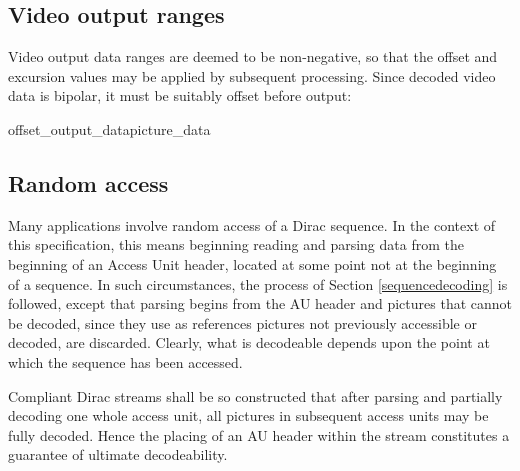 \subsection{Video output ranges}
\label{videooutput}

Video output data ranges are deemed to be non-negative, so that the offset and excursion values 
may be applied by subsequent processing. Since decoded video data is bipolar, it must be 
suitably offset before output:

\begin{pseudo}{offset\_output\_data}{picture\_data}
        \bsCODE{\BitDepth=\LumaDepth}
    \bsELSE
        \bsCODE{\BitDepth=\ChromaDepth}
    \bsEND
        \bsEND
    \bsEND
\bsEND
\end{pseudo}

\subsection{Random access}
\label{randomaccess}

Many applications involve random access of a Dirac sequence. In the context of this specification, this
means beginning reading and parsing data from the beginning of an Access Unit header, located
at some point not at the beginning of a sequence. In such circumstances, the process of Section 
\ref{sequencedecoding} is followed, except that parsing begins from the AU header and pictures
that cannot be decoded, since they use as references pictures not previously accessible or decoded, are discarded.
Clearly, what is decodeable depends upon the point at which the sequence has been accessed.

Compliant Dirac streams shall be so constructed that after parsing and partially decoding one whole
access unit, all pictures in subsequent access units may be fully decoded. Hence the placing of
an AU header within the stream constitutes a guarantee of ultimate decodeability.

